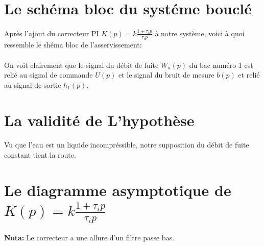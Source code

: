\documentclass[12pt, a4paper, openany]{report}
\begin{document}

 \section{Le schéma bloc du systéme bouclé} 

\paragraph{}
	Après l'ajout du correcteur PI $K(p)= k \frac {1+\tau_{i}p}{\tau_{i}p}$ à notre système, voici à quoi ressemble le       shéma bloc de l'asservissement:
  \begin{center}
    \label{fig2}
  \end{center}    
 
 \paragraph{}
	On voit clairement que le signal du débit de fuite $W_{u}(p)$ du bac numéro 1 est relié au signal de commande $U(p)$ et le signal du bruit de mesure $b(p)$ et relié au signal de sortie $h_{1}(p)$.    
	
 \section{La validité de L'hypothèse} 
  
 \paragraph{}       
	Vu que l'eau est un liquide incompréssible, notre supposition du débit de fuite constant tient la route.
	
 \section{Le diagramme asymptotique de $K(p)= k \frac {1+\tau_{i}p}{\tau_{i}p}$} 
 
  \begin{center}
    \label{fig3}
  \end{center}

  \textbf{Nota:} \hspace{2mm} Le correcteur a une allure d'un filtre passe bas.
\end{document}
